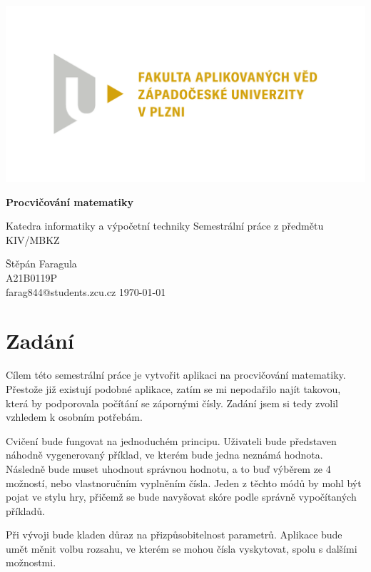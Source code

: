 \documentclass[12pt]{report}
\begin{document}
	\begin{titlepage}
		\centering
		\Large
		
		\includegraphics[width=.7\textwidth]{fav}
		
		\vspace{15mm}
		{\Huge\bfseries Procvičování matematiky}

		\vspace{5mm}
		{\LARGE Katedra informatiky a výpočetní techniky}
		{\LARGE Semestrální práce z předmětu KIV/MBKZ}
		
		\vfill
		\raggedright
		Štěpán Faragula\\
		A21B0119P\\
		farag844@students.zcu.cz
		\hfill 
		\today
	\end{titlepage}

	
	\tableofcontents


	\chapter{Zadání}
	Cílem této semestrální práce je vytvořit aplikaci na procvičování matematiky. Přestože již existují podobné aplikace, zatím se mi nepodařilo najít takovou, která by podporovala počítání se zápornými čísly. Zadání jsem si tedy zvolil vzhledem k osobním potřebám.
	
	Cvičení bude fungovat na jednoduchém principu. Uživateli bude představen náhodně vygenerovaný příklad, ve kterém bude jedna neznámá hodnota. Následně bude muset uhodnout správnou hodnotu, a to buď výběrem ze 4 možností, nebo vlastnoručním vyplněním čísla. Jeden z těchto módů by mohl být pojat ve stylu hry, přičemž se bude navyšovat skóre podle správně vypočítaných příkladů. 
	
	Při vývoji bude kladen důraz na přizpůsobitelnost parametrů. Aplikace bude umět měnit volbu rozsahu, ve kterém se mohou čísla vyskytovat, spolu s dalšími možnostmi.
\end{document}
